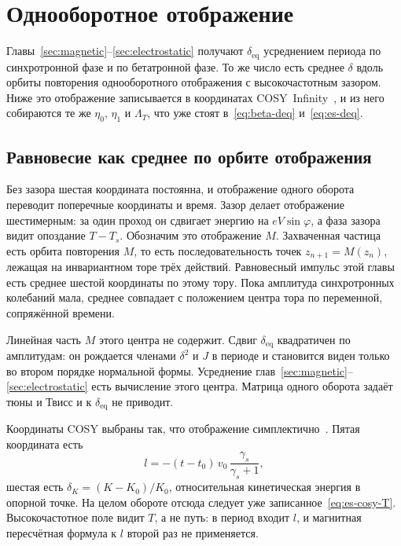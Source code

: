 \documentclass[aps,pra,preprint,a4paper,amsmath,amssymb,longbibliography]{revtex4-2}
\begin{document}
\section{Однооборотное отображение}
\label{sec:map}

Главы~\ref{sec:magnetic}--\ref{sec:electrostatic} получают $\delta_{\mathrm{eq}}$ усреднением периода по синхротронной фазе и по бетатронной фазе. То же число есть среднее $\delta$ вдоль орбиты повторения однооборотного отображения с высокочастотным зазором. Ниже это отображение записывается в координатах COSY~Infinity~\cite{Berz1990}, и из него собираются те же $\eta_0$, $\eta_1$ и $\Lambda_T$, что уже стоят в~\eqref{eq:beta-deq} и~\eqref{eq:es-deq}.

\subsection{Равновесие как среднее по орбите отображения}
\label{sec:map-orbit}

Без зазора шестая координата постоянна, и отображение одного оборота переводит поперечные координаты и время. Зазор делает отображение шестимерным: за один проход он сдвигает энергию на $eV\sin\varphi$, а фаза зазора видит опоздание $T-T_s$. Обозначим это отображение $M$. Захваченная частица есть орбита повторения $M$, то есть последовательность точек $z_{n+1}=M(z_n)$, лежащая на инвариантном торе трёх действий. Равновесный импульс этой главы есть среднее шестой координаты по этому тору. Пока амплитуда синхротронных колебаний мала, среднее совпадает с положением центра тора по переменной, сопряжённой времени.

Линейная часть $M$ этого центра не содержит. Сдвиг $\delta_{\mathrm{eq}}$ квадратичен по амплитудам: он рождается членами $\delta^2$ и $J$ в периоде и становится виден только во втором порядке нормальной формы. Усреднение глав~\ref{sec:magnetic}--\ref{sec:electrostatic} есть вычисление этого центра. Матрица одного оборота задаёт тюны и Твисс и к $\delta_{\mathrm{eq}}$ не приводит.

Координаты COSY выбраны так, что отображение симплектично~\cite{Berz1990}. Пятая координата есть
\begin{equation}
\label{eq:map-l}
l=-(t-t_0)\,v_0\,\frac{\gamma_s}{\gamma_s+1},
\end{equation}
шестая есть $\delta_K=(K-K_0)/K_0$, относительная кинетическая энергия в опорной точке. На целом обороте отсюда следует уже записанное~\eqref{eq:es-cosy-T}. Высокочастотное поле видит $T$, а не путь: в период входит $l$, и магнитная пересчётная формула к $l$ второй раз не применяется.
\end{document}
